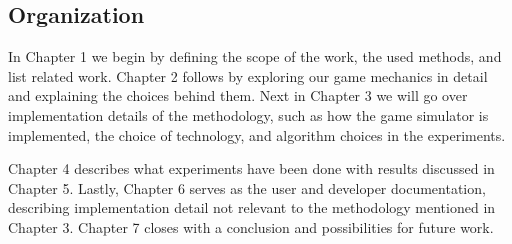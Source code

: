 \subsection*{Organization}

In Chapter 1  we begin by defining
the scope of the work, the used methods, and list related work. Chapter 2
follows by exploring our game mechanics in detail and explaining the choices
behind them. Next in Chapter 3 we will go over implementation details of the
methodology, such as how the game simulator is implemented, the choice of
technology, and algorithm choices in the experiments.

Chapter 4 describes what experiments have been done with results discussed in
Chapter 5. Lastly, Chapter 6 serves as the user and developer documentation,
describing implementation detail not relevant to the methodology mentioned in
Chapter 3. Chapter 7 closes with a conclusion and possibilities for future
work.
